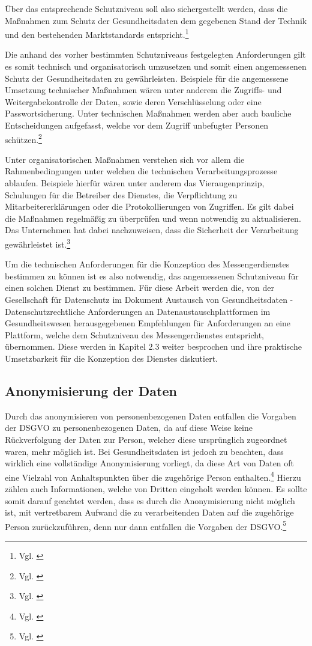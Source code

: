 Über das entsprechende Schutzniveau soll also sichergestellt werden, dass die Maßnahmen zum Schutz der Gesundheitsdaten dem gegebenen Stand der Technik und den bestehenden Marktstandards entspricht.\footnote{Vgl. \cite[S. 740]{Kuhnl2018}}

Die anhand des vorher bestimmten Schutzniveaus festgelegten Anforderungen gilt es somit technisch und organisatorisch umzusetzen und somit einen angemessenen Schutz der Gesundheitsdaten zu gewährleisten. Beispiele für die angemessene Umsetzung technischer Maßnahmen wären unter anderem die Zugriffs- und Weitergabekontrolle der Daten, sowie deren Verschlüsselung oder eine Passwortsicherung. Unter technischen Maßnahmen werden aber auch bauliche Entscheidungen aufgefasst, welche vor dem Zugriff unbefugter Personen schützen.\footnote{Vgl. \cite[S. 41 ff.]{Bundesaerztekammer2020}}

Unter organisatorischen Maßnahmen verstehen sich vor allem die Rahmenbedingungen unter welchen die technischen Verarbeitungsprozesse ablaufen. Beispiele hierfür wären unter anderem das Vieraugenprinzip, Schulungen für die Betreiber des Dienstes, die Verpflichtung zu Mitarbeitererklärungen oder die Protokollierungen von Zugriffen. Es gilt dabei die Maßnahmen regelmäßig zu überprüfen und wenn notwendig zu aktualisieren. Das Unternehmen hat dabei nachzuweisen, dass die Sicherheit der Verarbeitung gewährleistet ist.\footnote{Vgl. \cite[S. 42 ff.]{Bundesaerztekammer2020}}

Um die technischen Anforderungen für die Konzeption des Messengerdienstes bestimmen zu können ist es also notwendig, das angemessenen Schutzniveau für einen solchen Dienst zu bestimmen. Für diese Arbeit werden die, von der Gesellschaft für Datenschutz im Dokument \glqq Austausch von Gesundheitsdaten -  Datenschutzrechtliche Anforderungen an Datenaustauschplattformen im Gesundheitswesen\grqq{} herausgegebenen Empfehlungen für Anforderungen an eine Plattform, welche dem Schutzniveau des Messengerdienstes entspricht, übernommen. Diese werden in Kapitel 2.3 weiter besprochen und ihre praktische Umsetzbarkeit für die Konzeption des Dienstes diskutiert. 


\subsection{Anonymisierung der Daten}\label{subsection:add}
Durch das anonymisieren von personenbezogenen Daten entfallen die Vorgaben der DSGVO zu personenbezogenen Daten, da auf diese Weise keine Rückverfolgung der Daten zur Person, welcher diese ursprünglich zugeordnet waren, mehr möglich ist. Bei Gesundheitsdaten ist jedoch zu beachten, dass wirklich eine vollständige Anonymisierung vorliegt, da diese Art von Daten oft eine Vielzahl von Anhaltspunkten über die zugehörige Person enthalten.\footnote{Vgl. \cite[S. 429 ff.]{Voigt2018}}
Hierzu zählen auch Informationen, welche von Dritten eingeholt werden können. Es sollte somit darauf geachtet werden, dass es durch die Anonymisierung nicht möglich ist, mit vertretbarem Aufwand die zu verarbeitenden Daten auf die zugehörige Person zurückzuführen, denn nur dann entfallen die Vorgaben der DSGVO.\footnote{Vgl. \cite[S. 5 f.]{Bundesaerztekammer2020}}

